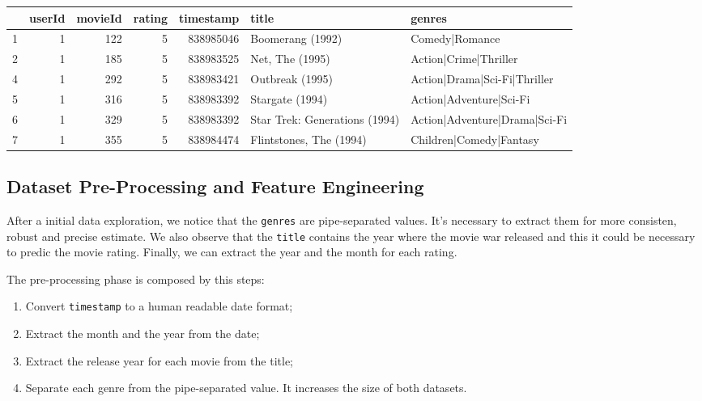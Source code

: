 \documentclass[
]{article}
\providecommand{\tightlist}{%
  \setlength{\itemsep}{0pt}\setlength{\parskip}{0pt}}
\begin{document}
\begin{table}
\centering\begingroup\fontsize{10}{12}\selectfont

\begin{tabular}{l|r|r|r|r|l|l}
\hline
  & userId & movieId & rating & timestamp & title & genres\\
\hline
1 & 1 & 122 & 5 & 838985046 & Boomerang (1992) & Comedy|Romance\\
\hline
2 & 1 & 185 & 5 & 838983525 & Net, The (1995) & Action|Crime|Thriller\\
\hline
4 & 1 & 292 & 5 & 838983421 & Outbreak (1995) & Action|Drama|Sci-Fi|Thriller\\
\hline
5 & 1 & 316 & 5 & 838983392 & Stargate (1994) & Action|Adventure|Sci-Fi\\
\hline
6 & 1 & 329 & 5 & 838983392 & Star Trek: Generations (1994) & Action|Adventure|Drama|Sci-Fi\\
\hline
7 & 1 & 355 & 5 & 838984474 & Flintstones, The (1994) & Children|Comedy|Fantasy\\
\hline
\end{tabular}
\endgroup{}
\end{table}

\hypertarget{dataset-pre-processing-and-feature-engineering}{%
\subsection{Dataset Pre-Processing and Feature
Engineering}\label{dataset-pre-processing-and-feature-engineering}}

After a initial data exploration, we notice that the \texttt{genres} are
pipe-separated values. It's necessary to extract them for more
consisten, robust and precise estimate. We also observe that the
\texttt{title} contains the year where the movie war released and this
it could be necessary to predic the movie rating. Finally, we can
extract the year and the month for each rating.

The pre-processing phase is composed by this steps:

\begin{enumerate}
\def\labelenumi{\arabic{enumi}.}
\tightlist
\item
  Convert \texttt{timestamp} to a human readable date format;
\item
  Extract the month and the year from the date;
\item
  Extract the release year for each movie from the title;
\item
  Separate each genre from the pipe-separated value. It increases the
  size of both datasets.
\end{enumerate}
\end{document}
